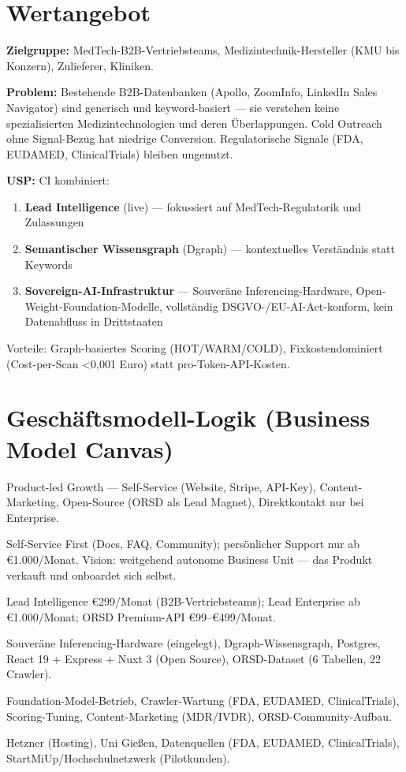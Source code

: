 \documentclass[a4paper,10pt]{article}
\begin{document}
\section{Wertangebot}

\textbf{Zielgruppe:} MedTech-B2B-Vertriebsteams, Medizintechnik-Hersteller (KMU bis Konzern), Zulieferer, Kliniken.

\textbf{Problem:} Bestehende B2B-Datenbanken (Apollo, ZoomInfo, LinkedIn Sales Navigator) sind generisch und keyword-basiert — sie verstehen keine spezialisierten Medizintechnologien und deren Überlappungen. Cold Outreach ohne Signal-Bezug hat niedrige Conversion. Regulatorische Signale (FDA, EUDAMED, ClinicalTrials) bleiben ungenutzt.

\textbf{USP:} CI kombiniert:
\begin{enumerate}[nosep,leftmargin=1.8em]
  \item \textbf{Lead Intelligence} (live) — fokussiert auf MedTech-Regulatorik und Zulassungen
  \item \textbf{Semantischer Wissensgraph} (Dgraph) — kontextuelles Verständnis statt Keywords
  \item \textbf{Sovereign-AI-Infrastruktur} — Souveräne Inferencing-Hardware, Open-Weight-Foundation-Modelle, vollständig DSGVO-/EU-AI-Act-konform, kein Datenabfluss in Drittstaaten
\end{enumerate}
Vorteile: Graph-basiertes Scoring (HOT/WARM/COLD), Fixkostendominiert (Cost-per-Scan <0,001 Euro) statt pro-Token-API-Kosten.

\section{Geschäftsmodell-Logik (Business Model Canvas)}

\begin{description}[nosep,leftmargin=3em,style=nextline,itemsep=1.5pt]
  \item[Kanäle] Product-led Growth — Self-Service (Website, Stripe, API-Key), Content-Marketing, Open-Source (ORSD als Lead Magnet), Direktkontakt nur bei Enterprise.
  \item[Kundenbeziehungen] Self-Service First (Docs, FAQ, Community); persönlicher Support nur ab €1.000/Monat. Vision: weitgehend autonome Business Unit — das Produkt verkauft und onboardet sich selbst.
  \item[Einnahmequellen] Lead Intelligence €299/Monat (B2B-Vertriebsteams); Lead Enterprise ab €1.000/Monat; ORSD Premium-API €99–€499/Monat.
  \item[Schlüsselressourcen] Souveräne Inferencing-Hardware (eingelegt), Dgraph-Wissensgraph, Postgres, React 19 + Express + Nuxt 3 (Open Source), ORSD-Dataset (6 Tabellen, 22 Crawler).
  \item[Schlüsselaktivitäten] Foundation-Model-Betrieb, Crawler-Wartung (FDA, EUDAMED, ClinicalTrials), Scoring-Tuning, Content-Marketing (MDR/IVDR), ORSD-Community-Aufbau.
  \item[Schlüsselpartner] Hetzner (Hosting), Uni Gießen, Datenquellen (FDA, EUDAMED, ClinicalTrials), StartMiUp/Hochschulnetzwerk (Pilotkunden).
\end{description}
\end{document}
